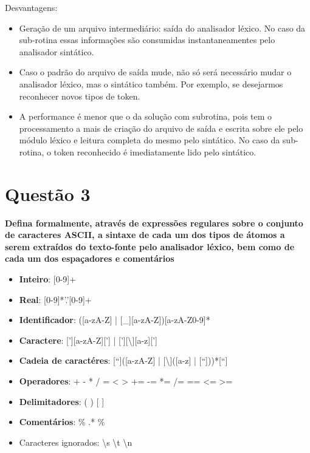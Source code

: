 \documentclass[
	article,			%
	11pt,				%
	oneside,			%
	a4paper,			%
	english,			%
	brazil,				%
	]{abntex2}
\begin{document}
Desvantagens:
\begin{itemize}
	\item Geração de um arquivo intermediário: saída do analisador léxico. No caso da sub-rotina essas informações são consumidas instantaneamentes pelo analisador sintático.
	\item Caso o padrão do arquivo de saída mude, não só será necessário mudar o analisador léxico, mas o sintático também. Por exemplo, se desejarmos reconhecer novos tipos de token.
	\item A performance é menor que o da solução com subrotina, pois tem o processamento a mais de criação do arquivo de saída e escrita sobre ele pelo módulo léxico e leitura completa do mesmo pelo sintático. No caso da sub-rotina, o token reconhecido é imediatamente lido pelo sintático.
\end{itemize}


\section{Questão 3}

\textbf{Defina formalmente, através de expressões regulares sobre o conjunto de caracteres ASCII, a sintaxe de cada um dos tipos de átomos a serem extraídos do texto-fonte pelo analisador léxico, bem como de cada um dos espaçadores e comentários}

\begin{itemize}
	\item \textbf{Inteiro}: [0-9]+

	\item \textbf{Real}: [0-9]*'.'[0-9]+

	\item \textbf{Identificador}: ([a-zA-Z] | [\_][a-zA-Z])[a-zA-Z0-9]*

	\item \textbf{Caractere}: ['][a-zA-Z]['] | ['][\textbackslash ][a-z][']

	\item \textbf{Cadeia de caractéres}: [“]([a-zA-Z] | [\textbackslash ]([a-z] | [“]))*[“]

	\item \textbf{Operadores}: + - * / = < > += -= *= /= == <= >=

	\item \textbf{Delimitadores}: ( ) { } [ ]

	\item \textbf{Comentários}: \% .* \%

	\item Caracteres ignorados: \textbackslash s \textbackslash t \textbackslash n
\end{itemize}
\end{document}
